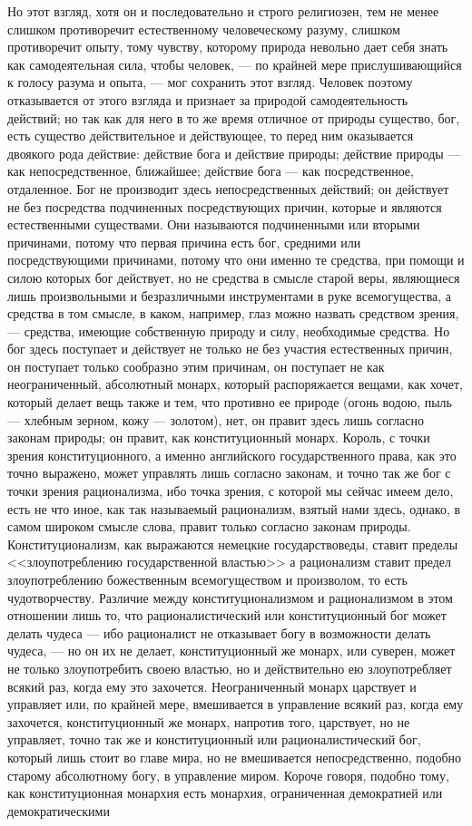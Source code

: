 \documentclass[12pt]{article}
\begin{document}
Но этот взгляд, хотя он и последовательно и строго религиозен, тем не менее слишком противоречит естественному человеческому разуму, слишком противоречит опыту, тому чувству, которому природа невольно дает себя знать как самодеятельная сила, чтобы человек, --- по крайней мере прислушивающийся к голосу разума и опыта, --- мог сохранить этот взгляд. Человек поэтому отказывается от этого взгляда и признает за природой самодеятельность действий; но так как для него в то же время отличное от природы существо, бог, есть существо действительное и действующее, то перед ним оказывается двоякого рода действие: действие бога и действие природы; действие природы --- как непосредственное, ближайшее; действие бога --- как посредственное, отдаленное. Бог не производит здесь непосредственных действий; он действует не без посредства подчиненных посредствующих причин, которые и являются естественными существами. Они называются подчиненными или вторыми причинами, потому что первая причина есть бог, средними или посредствующими причинами, потому что они именно те средства, при помощи и силою которых бог действует, но не средства в смысле старой веры, являющиеся лишь произвольными и безразличными инструментами в руке всемогущества, а средства в том смысле, в каком, например, глаз можно назвать средством зрения, --- средства, имеющие собственную природу и силу, необходимые средства. Но бог здесь поступает и действует не только не без участия естественных причин, он поступает только сообразно этим причинам, он поступает не как неограниченный, абсолютный монарх, который распоряжается вещами, как хочет, который делает вещь также и тем, что противно ее природе (огонь водою, пыль --- хлебным зерном, кожу --- золотом), нет, он правит здесь лишь согласно законам природы; он правит, как конституционный монарх. Король, с точки зрения конституционного, а именно английского государственного права, как это точно выражено, может управлять лишь согласно законам, и точно так же бог с точки зрения рационализма, ибо точка зрения, с которой мы сейчас имеем дело, есть не что иное, как так называемый рационализм, взятый нами здесь, однако, в самом широком смысле слова, правит только согласно законам природы. Конституционализм, как выражаются немецкие государствоведы, ставит пределы <<злоупотреблению государственной властью>>  а рационализм ставит предел злоупотреблению божественным всемогуществом и произволом, то есть чудотворчеству. Различие между конституционализмом и рационализмом в этом отношении лишь то, что рационалистический или конституционный бог может делать чудеса --- ибо рационалист не отказывает богу в возможности делать чудеса, --- но он их не делает, конституционный же монарх, или суверен, может не только злоупотребить своею властью, но и действительно ею злоупотребляет всякий раз, когда ему это захочется. Неограниченный монарх царствует и управляет или, по крайней мере, вмешивается в управление всякий раз, когда ему захочется, конституционный же монарх, напротив того, царствует, но не управляет, точно так же и конституционный или рационалистический бог, который лишь стоит во главе мира, но не вмешивается непосредственно, подобно старому абсолютному богу, в управление миром. Короче говоря, подобно тому, как конституционная монархия есть монархия, ограниченная демократией или демократическими 
\end{document}
